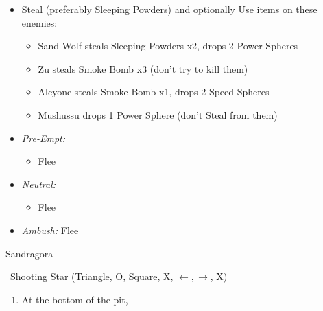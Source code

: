 \begin{encounters}
    \begin{itemize}
        \item Steal (preferably Sleeping Powders) and optionally Use items on these enemies:
        \begin{itemize}
            \item Sand Wolf steals Sleeping Powders x2, drops 2 Power Spheres
            \item Zu steals Smoke Bomb x3 (don't try to kill them)
            \item Alcyone steals Smoke Bomb x1, drops 2 Speed Spheres
            \item Mushussu drops 1 Power Sphere (don't Steal from them)
        \end{itemize}
        \item \textit{Pre-Empt:}
        \begin{itemize}
            \tidusf Defend
            \rikkuf Steal or Use a Smoke Bomb/Silence Grenade/Sleeping Powder
            \luluf Defend
            \item Flee
        \end{itemize}
        \item \textit{Neutral:}
        \begin{itemize}
            \switch{\tidus}{\kimahri}
            \kimahrif Steal
            \rikkuf Switch for \tidus\ or Use a Smoke Bomb/Silence Grenade/Sleeping Powder
            \item Flee
        \end{itemize}
        \item \textit{Ambush:} Flee
    \end{itemize}
\end{encounters}
\begin{battle}{Sandragora}
    \begin{itemize}
        \switch{\tidus}{\auron}
        \auronf \od\ Shooting Star (Triangle, O, Square, X, $\leftarrow, \rightarrow$, X)
    \end{itemize}
\end{battle}
\begin{enumerate}[resume]
    \item At the bottom of the pit, 
\end{enumerate}
